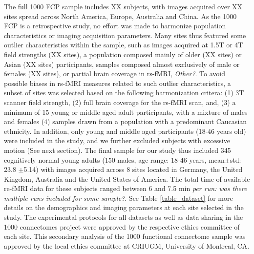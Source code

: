 \documentclass[authoryear]{elsarticle}
\begin{document}
The full 1000 FCP sample includes XX subjects, with images acquired over XX sites spread across North America, Europe, Australia and China. As the 1000 FCP is a retrospective study, no effort was made to harmonize population characteristics or imaging acquisition parameters. Many sites thus featured some outlier characteristics within the sample, such as images acquired at 1.5T or 4T field strengths (XX sites), a population composed mainly of older (XX sites) or Asian (XX sites) participants, samples composed almost exclusively of male or females (XX sites), or partial brain coverage in rs-fMRI, \emph{Other?}. To avoid possible biases in rs-fMRI measures related to such outlier characteristics, a subset of sites was selected based on the following harmonization critera: (1) 3T scanner field strength, (2) full brain coverage for the rs-fMRI scan, and, (3) a minimum of 15 young or middle aged adult participants, with a mixture of males and females (4) samples drawn from a population with a predominant Caucasian ethnicity. In addition, only young and middle aged participants (18-46 years old) were included in the study, and we further excluded subjects with excessive motion (See next section). The final sample for our study thus included 345 cognitively normal young adults (150 males, age range: 18-46 years, mean$\pm$std: 23.8 $\pm$5.14) with images acquired across 8 sites located in Germany, the United Kingdom, Australia and the United States of America. The total time of available re-fMRI data for these subjects ranged between 6 and 7.5 min \emph{per run: was there multiple runs included for some sample?}. See Table \ref{table_dataset} for more details on the demographics and imaging parameters at each site selected in the study. The experimental protocols for all datasets as well as data sharing in the 1000 connectomes project were approved by the respective ethics committee of each site. This secondary analysis of the 1000 functional connectome sample was approved by the local ethics committee at CRIUGM, University of Montreal, CA. 

 
\end{document}
